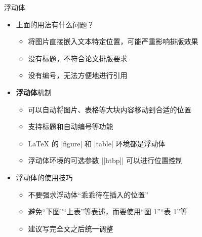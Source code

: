 \begin{frame}[fragile]{浮动体}
  \begin{itemize}
    \item 上面的用法有什么问题？
          \begin{itemize}
            \item 将图片直接嵌入文本特定位置，可能严重影响排版效果
            \item 没有标题，不符合论文排版要求
            \item 没有编号，无法方便地进行引用
          \end{itemize}
    \item \textbf{浮动体}机制
          \begin{itemize}
            \item 可以自动将图片、表格等大块内容移动到合适的位置
            \item 支持标题和自动编号等功能
            \item \LaTeX{} 的 |figure| 和 |table| 环境都是浮动体
            \item 浮动体环境的可选参数 |[htbp]| 可以进行位置控制
          \end{itemize}
    \item 浮动体的使用技巧
          \begin{itemize}
            \item 不要强求浮动体“乖乖待在插入的位置”
            \item 避免“下图”“上表”等表述，而要使用“图 1”“表 1”等
            \item 建议写完全文之后统一调整
          \end{itemize}
  \end{itemize}
\end{frame}


